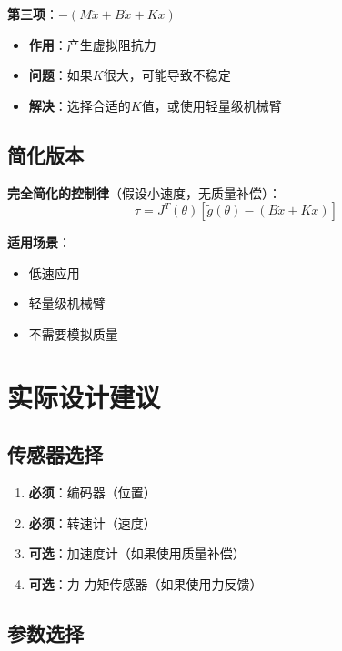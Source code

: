 \documentclass[12pt,a4paper]{article}
\begin{document}
\textbf{第三项}：$-(M\ddot{x} + B\dot{x} + Kx)$
\begin{itemize}
\item \textbf{作用}：产生虚拟阻抗力
\item \textbf{问题}：如果$K$很大，可能导致不稳定
\item \textbf{解决}：选择合适的$K$值，或使用轻量级机械臂
\end{itemize}

\subsection{简化版本}

\textbf{完全简化的控制律}（假设小速度，无质量补偿）：
\begin{equation}
\tau = J^T(\theta)\left[\tilde{g}(\theta) - (B\dot{x} + Kx)\right]
\end{equation}

\textbf{适用场景}：
\begin{itemize}
\item 低速应用
\item 轻量级机械臂
\item 不需要模拟质量
\end{itemize}

\section{实际设计建议}

\subsection{传感器选择}

\begin{enumerate}
\item \textbf{必须}：编码器（位置）
\item \textbf{必须}：转速计（速度）
\item \textbf{可选}：加速度计（如果使用质量补偿）
\item \textbf{可选}：力-力矩传感器（如果使用力反馈）
\end{enumerate}

\subsection{参数选择}
\end{document}
